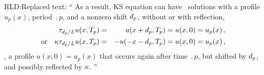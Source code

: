 

\medskip

RLD:{Replaced text: ``
As a result, KS equation can have
\rpo\ solutions with a profile $u_p(x)$, period $\period{p}$, and a
nonzero shift $d_p$, without or with reflection,
\begin{eqnarray}
  \tau_{d_p/L}u(x,{T_{p}}) &=&
  u(x+d_p,{T_{p}}) = u(x,0) = u_p(x)\,,
\label{KSrpos0} \\
  \mbox{or} \quad \kappa\tau_{d_p/L} u(x,{T_{p}}) &=&
  -u(-x-d_p,{T_{p}}) = u(x,0) = u_p(x)\,,
\label{KSpos0}
\end{eqnarray}
\ie, a profile $u(x,0) = u_p(x)$ that occurs again after time
$\period{p}$, but shifted by $d_p$, and possibly reflected by
$\kappa$.
   ''}

